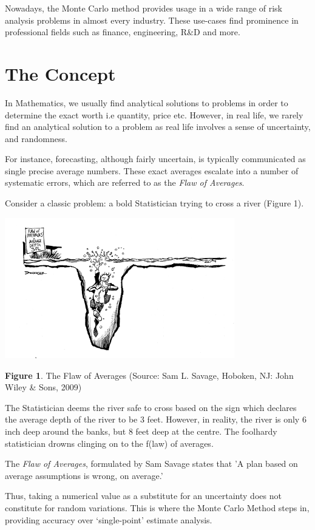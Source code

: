 \documentclass{resonance}
\begin{document}
	Nowadays, the Monte Carlo method provides usage in a wide range of risk analysis problems in almost every industry. These use-cases find prominence in professional fields such as finance, engineering, R\&D and more.
	
	\section{The Concept}
	In Mathematics, we usually find analytical solutions to problems in order to determine the exact worth i.e quantity, price etc. However, in real life, we rarely find an analytical solution to a problem as real life involves a sense of uncertainty, and randomness.
	
	For instance, forecasting, although fairly uncertain, is typically communicated as single precise average numbers. These exact averages escalate into a number of systematic errors, which are referred to as the \emph{Flaw of Averages}.
	
	Consider a classic problem: a bold Statistician trying to cross a river (Figure 1).
	
	\includegraphics[width=10cm]{the-flaw-of-averages}
	
	\scriptsize{\textbf{Figure 1}. The Flaw of Averages (Source: Sam L. Savage, Hoboken, NJ: John Wiley \& Sons, 2009)}
	
	\normalsize
	The Statistician deems the river safe to cross based on the sign which declares the average depth of the river to be 3 feet. However, in reality, the river is only 6 inch deep around the banks, but 8 feet deep at the centre. The foolhardy statistician drowns clinging on to the f(law) of averages.
	
	The \emph{Flaw of Averages}, formulated by Sam Savage states that 'A plan based on average assumptions is wrong, on average.'
	
	Thus, taking a numerical value as a substitute for an uncertainty does not constitute for random variations. This is where the Monte Carlo Method steps in, providing accuracy over ‘single-point’ estimate analysis.
	
\end{document}
